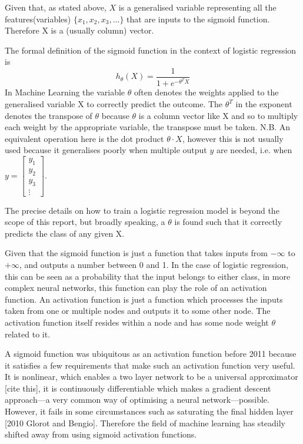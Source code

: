 \documentclass[a4paper,fleqn,usenatbib]{mnras}
\begin{document}
Given that, as stated above, $X$ is a generalised variable representing all the features(variables) $\{x_1,x_2,x_3,...\}$ that are inputs to the sigmoid function. Therefore X is a (usually column) vector.

The formal definition of the sigmoid function in the context of logistic regression is 
\begin{equation}
	h_\theta(X)=\frac{1}{1+e^{-\theta^T X}}
\end{equation}
In Machine Learning the variable $\theta$ often denotes the weights applied to the generalised variable X to correctly predict the outcome. The $\theta^T$ in the exponent denotes the transpose of $\theta$ because $\theta$ is a column vector like X and so to multiply each weight by the appropriate variable, the transpose must be taken. N.B. An equivalent operation here is the dot product $\theta \cdot X$, however this is not usually used because it generalises poorly when multiple output $y$ are needed, i.e. when $y=\begin{bmatrix}
           y_{1} \\
           y_{2} \\
           y_{3} \\
           \vdots
         \end{bmatrix}$.

The precise details on how to train a logistic regression model is beyond the scope of this report, but broadly speaking, a $\theta$ is found such that it correctly predicts the class of any given X. 

Given that the sigmoid function is just a function that takes inputs from $-\infty$ to $+\infty$, and outputs a number between 0 and 1. In the case of logistic regression, this can be seen as a probability that the input belongs to either class, in more complex neural networks, this function can play the role of an activation function. An activation function is just a function which processes the inputs taken from one or multiple nodes and outputs it to some other node. The activation function itself resides within a node and has some node weight $\theta$ related to it. 

A sigmoid function was ubiquitous as an activation function before 2011 because it satisfies a few requirements that make such an activation function very useful. It is nonlinear, which enables a two layer network to be a universal approximator [cite this], it is continuously differentiable which makes a gradient descent approach---a very common way of optimising a neural network---possible. However, it fails in some circumstances such as saturating the final hidden layer [2010 Glorot and Bengio]. Therefore the field of machine learning has steadily shifted away from using sigmoid activation functions.
\end{document}
